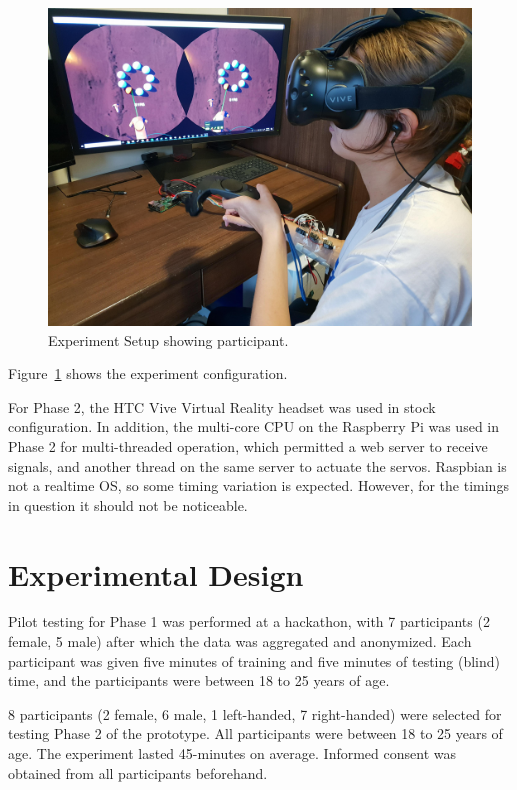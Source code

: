 \documentclass[
hidelinks,
12pt, %
oneside, %
english, %
doublespacing, %
headsepline, %
]{MastersDoctoralThesis} %
\begin{document}
\begin{figure}[h]
	\centering\includegraphics[width=1\linewidth]{images/experimentsetup.jpg}
	\decoRule
	\caption[Experiment Setup]{Experiment Setup showing participant.}
	\label{fig:experimentsetup}
\end{figure}

Figure~\ref{fig:experimentsetup} shows the experiment configuration.

For Phase 2, the HTC Vive Virtual Reality headset was used in stock configuration. In addition, the multi-core CPU on the Raspberry Pi was used in Phase 2 for multi-threaded operation, which permitted a web server to receive signals, and another thread on the same server to actuate the servos. Raspbian is not a realtime OS, so some timing variation is expected. However, for the timings in question it should not be noticeable.

\section{Experimental Design}

Pilot testing for Phase 1 was performed at a hackathon, with 7 participants (2 female, 5 male) after which the data was aggregated and anonymized. Each participant was given five minutes of training and five minutes of testing (blind) time, and the participants were between 18 to 25 years of age.

8 participants (2 female, 6 male, 1 left-handed, 7 right-handed) were selected for testing Phase 2 of the prototype. All participants were between 18 to 25 years of age. The experiment lasted 45-minutes on average. Informed consent was obtained from all participants beforehand.
\end{document}
